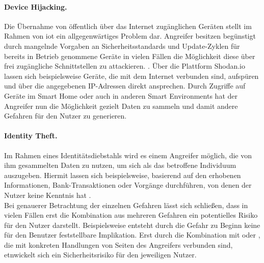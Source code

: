 \paragraph{Device Hijacking.}
\label{sec:Grundlagen:para:Device Hijacking}
Die Übernahme von öffentlich über das Internet zugänglichen Geräten stellt im Rahmen von \ac{iot} ein allgegenwärtiges Problem dar. Angreifer besitzen begünstigt durch mangelnde Vorgaben an Sicherheitsstandards und Update-Zyklen für bereits in Betrieb genommene Geräte in vielen Fällen die Möglichkeit diese über frei zugängliche Schnittstellen zu attackieren. \cite{SecPrivSmartCity2021}. Über die Plattform Shodan.io lassen sich beispielsweise Geräte, die mit dem Internet verbunden sind, aufspüren und über die angegebenen IP-Adressen direkt ansprechen. Durch Zugriffe auf Geräte im Smart Home oder auch in anderen Smart Environments hat der Angreifer nun die Möglichkeit gezielt Daten zu sammeln und damit andere Gefahren für den Nutzer zu generieren.

\paragraph{Identity Theft.}
\label{sec:Grundlagen:para:Identity Theft}
Im Rahmen eines Identitätsdiebstahls wird es einem Angreifer möglich, die von ihm gesammelten Daten zu nutzen, um sich als das betroffene Individuum auszugeben. Hiermit lassen sich beispielsweise, basierend auf den erhobenen Informationen, Bank-Transaktionen oder Vorgänge durchführen, von denen der Nutzer keine Kenntnis hat \cite{SecPrivSmartCity2021}.\\

Bei genauerer Betrachtung der einzelnen Gefahren lässt sich schließen, dass in vielen Fällen erst die Kombination aus mehreren Gefahren ein potentielles Risiko für den Nutzer darstellt. Beispielsweise entsteht durch die Gefahr  zu Beginn keine für den Benutzer feststellbare Implikation. Erst durch die Kombination mit  oder , die mit konkreten Handlungen von Seiten des Angreifers verbunden sind, etnwickelt sich ein Sicherheitsrisiko für den jeweiligen Nutzer. 


